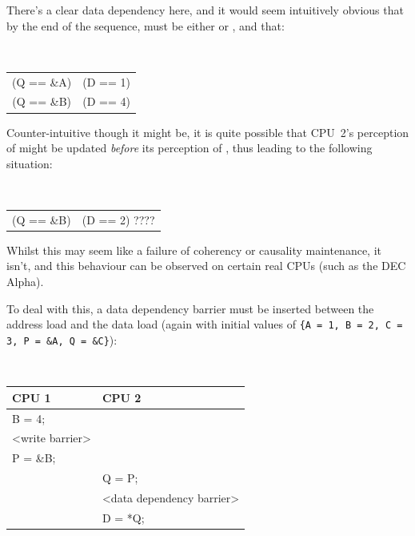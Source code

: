 There's a clear data dependency here, and it would seem intuitively
obvious that by the end of the sequence,  must be either 
or , and that:

\vspace{5pt}
\begin{minipage}[t]{\columnwidth}
\tt
\scriptsize
\begin{tabular}{c@{ implies }c}
	(Q == \&A) & (D == 1) \\
	(Q == \&B) & (D == 4) \\
\end{tabular}
\end{minipage}
\vspace{5pt}

Counter-intuitive though it might be, it is quite possible that
CPU~2's perception of  might be updated \emph{before} its perception
of , thus leading to the following situation:

\vspace{5pt}
\begin{minipage}[t]{\columnwidth}
\tt
\scriptsize
\begin{tabular}{c@{ and }c}
	(Q == \&B) & (D == 2) ???? \\
\end{tabular}
\end{minipage}
\vspace{5pt}

Whilst this may seem like a failure of coherency or causality maintenance, it
isn't, and this behaviour can be observed on certain real CPUs (such as the DEC
Alpha).

To deal with this, a data dependency barrier must be inserted between the
address load and the data load (again with initial values of
{\tt \{A = 1, B = 2, C = 3, P = \&A, Q = \&C\}}):

\vspace{5pt}
\begin{minipage}[t]{\columnwidth}
\tt
\scriptsize
\begin{tabular}{l|p{1.5in}}
	CPU 1 &		CPU 2 \\
	\hline
	B = 4; & \\
	<write barrier> & \\
	P = \&B; &	\\
		&	Q = P; \\
		&	<data dependency barrier> \\
		&	D = *Q; \\
\end{tabular}
\end{minipage}
\vspace{5pt}

